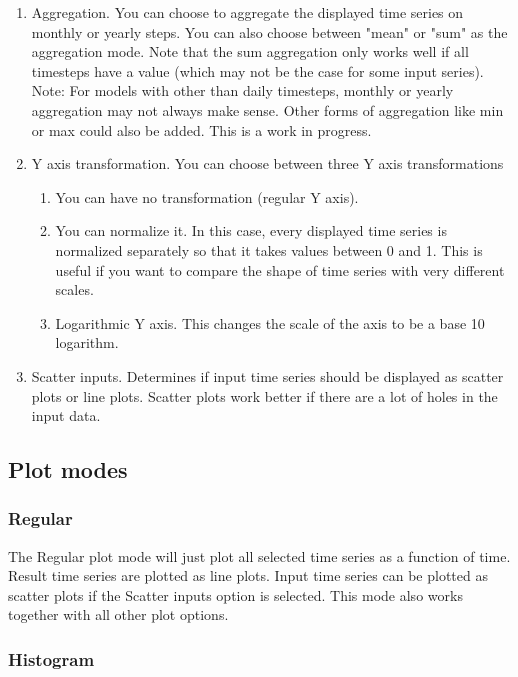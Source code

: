 \documentclass[11pt]{article}
\theoremstyle{definition}
\begin{document}
\begin{enumerate}[i]
\item Aggregation. You can choose to aggregate the displayed time series on monthly or yearly steps. You can also choose between "mean" or "sum" as the aggregation mode. Note that the sum aggregation only works well if all timesteps have a value (which may not be the case for some input series). Note: For models with other than daily timesteps, monthly or yearly aggregation may not always make sense. Other forms of aggregation like min or max could also be added. This is a work in progress.
\item Y axis transformation. You can choose between three Y axis transformations
\begin{enumerate}
\item You can have no transformation (regular Y axis).
\item You can normalize it. In this case, every displayed time series is normalized separately so that it takes values between 0 and 1. This is useful if you want to compare the shape of time series with very different scales.
\item Logarithmic Y axis. This changes the scale of the axis to be a base 10 logarithm.
\end{enumerate}
\item Scatter inputs. Determines if input time series should be displayed as scatter plots or line plots. Scatter plots work better if there are a lot of holes in the input data.
\end{enumerate}

\subsection{Plot modes}

\subsubsection{Regular}

The Regular plot mode will just plot all selected time series as a function of time. Result time series are plotted as line plots. Input time series can be plotted as scatter plots if the Scatter inputs option is selected. This mode also works together with all other plot options.

\subsubsection{Histogram}
\end{document}

